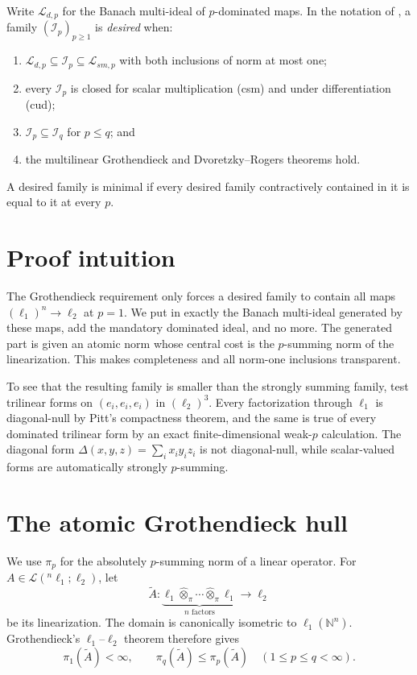 \documentclass[11pt]{amsart}
\newcommand{\N}{\mathbb N}
\newcommand{\Lcal}{\mathcal L}
\newcommand{\wh}{\widehat\otimes_{\pi}}
\begin{document}
Write $\Lcal_{d,p}$ for the Banach multi-ideal of $p$-dominated maps.  In the
notation of \cite{PS}, a family $(\mathcal I_p)_{p\geq1}$ is \emph{desired}
when:
\begin{enumerate}
\item $\Lcal_{d,p}\subseteq\mathcal I_p\subseteq\Lcal_{sm,p}$ with both
      inclusions of norm at most one;
\item every $\mathcal I_p$ is closed for scalar multiplication (csm) and
      under differentiation (cud);
\item $\mathcal I_p\subseteq\mathcal I_q$ for $p\leq q$; and
\item the multilinear Grothendieck and Dvoretzky--Rogers theorems hold.
\end{enumerate}
A desired family is minimal if every desired family contractively contained
in it is equal to it at every $p$.

\section*{Proof intuition}

The Grothendieck requirement only forces a desired family to contain all maps
$(\ell_1)^n\to\ell_2$ at $p=1$.  We put in exactly the Banach multi-ideal
generated by these maps, add the mandatory dominated ideal, and no more.
The generated part is given an atomic norm whose central cost is the
$p$-summing norm of the linearization.  This makes completeness and all
norm-one inclusions transparent.

To see that the resulting family is smaller than the strongly summing family,
test trilinear forms on $(e_i,e_i,e_i)$ in $(\ell_2)^3$.  Every factorization
through $\ell_1$ is diagonal-null by Pitt's compactness theorem, and the same
is true of every dominated trilinear form by an exact finite-dimensional
weak-$p$ calculation.  The diagonal form
$\Delta(x,y,z)=\sum_i x_i y_i z_i$ is not diagonal-null, while scalar-valued
forms are automatically strongly $p$-summing.

\section*{The atomic Grothendieck hull}

We use $\pi_p$ for the absolutely $p$-summing norm of a linear operator.  For
$A\in\Lcal({}^n\ell_1;\ell_2)$, let
\[
 \widetilde A:\underbrace{\ell_1\wh\cdots\wh\ell_1}_{n\text{ factors}}
 \longrightarrow\ell_2
\]
be its linearization.  The domain is canonically isometric to
$\ell_1(\N^n)$.  Grothendieck's $\ell_1$--$\ell_2$ theorem therefore gives
\begin{equation}\label{eq:groth-kernel}
 \pi_1(\widetilde A)<\infty,
 \qquad
 \pi_q(\widetilde A)\leq\pi_p(\widetilde A)
 \quad(1\leq p\leq q<\infty).
\end{equation}
\end{document}
